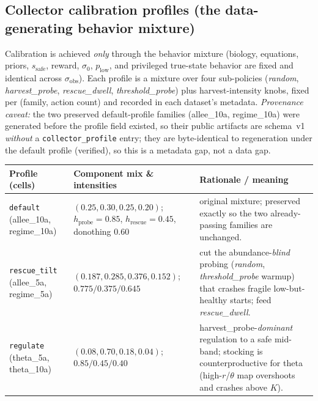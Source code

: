 \documentclass[11pt]{article}
\newcommand{\sobs}{\sigma_{\mathrm{obs}}}
\newcommand{\sthr}{s_{\mathrm{safe}}}
\begin{document}
\subsection{Collector calibration profiles (the data-generating behavior mixture)}
\label{sec:profiles}
Calibration is achieved \emph{only} through the behavior mixture (biology,
equations, priors, $\sthr$, reward, $\sigma_0$, $p_{\mathrm{low}}$, and privileged
true-state behavior are fixed and identical across $\sobs$). Each profile is a
mixture over four sub-policies (\emph{random}, \emph{harvest\_probe},
\emph{rescue\_dwell}, \emph{threshold\_probe}) plus harvest-intensity knobs, fixed
per (family, action count) and recorded in each dataset's metadata.
\emph{Provenance caveat:} the two preserved default-profile families
(allee\_10a, regime\_10a) were generated before the profile field existed, so their
public artifacts are schema~v1 \emph{without} a \texttt{collector\_profile} entry;
they are byte-identical to regeneration under the default profile (verified), so
this is a metadata gap, not a data gap.
\begin{longtable}{@{}p{3.0cm}p{4.4cm}p{6.6cm}@{}}
\toprule
Profile (cells) & Component mix \& intensities & Rationale / meaning \\
\midrule
\texttt{default} \newline (allee\_10a, regime\_10a) & $(0.25,0.30,0.25,0.20)$; $h_{\text{probe}}{=}0.85$, $h_{\text{rescue}}{=}0.45$, donothing $0.60$ & original mixture; preserved exactly so the two already-passing families are unchanged. \\
\texttt{rescue\_tilt} \newline (allee\_5a, regime\_5a) & $(0.187,0.285,0.376,0.152)$; $0.775/0.375/0.645$ & cut the abundance-\emph{blind} probing (\emph{random}, \emph{threshold\_probe} warmup) that crashes fragile low-but-healthy starts; feed \emph{rescue\_dwell}. \\
\texttt{regulate} \newline (theta\_5a, theta\_10a) & $(0.08,0.70,0.18,0.04)$; $0.85/0.45/0.40$ & harvest\_probe-\emph{dominant} regulation to a safe mid-band; stocking is counterproductive for theta (high-$r$/$\theta$ map overshoots and crashes above $K$). \\
\bottomrule
\end{longtable}
\end{document}

